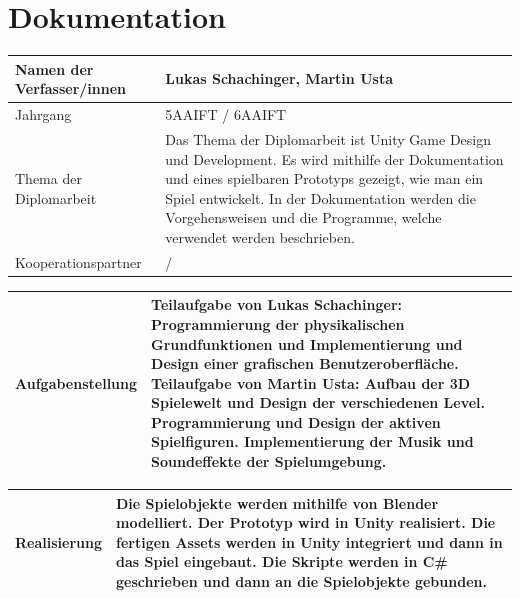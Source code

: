 \chapter{Dokumentation}

\renewcommand{\arraystretch}{2} %

\begin{tabular}{|m{}|m{}|}
\hline
Namen der Verfasser/innen & Lukas Schachinger, Martin Usta \\
\hline
Jahrgang & 5AAIFT / 6AAIFT \\
\hline
Thema der Diplomarbeit & Das Thema der Diplomarbeit ist Unity Game Design und Development. Es wird mithilfe der Dokumentation und eines spielbaren Prototyps gezeigt, wie man ein Spiel entwickelt. 
In der Dokumentation werden die Vorgehensweisen und die Programme, welche verwendet werden beschrieben. \\
\hline
Kooperationspartner & / \\
\hline
\end{tabular}

\vspace{10pt}

\noindent
\begin{tabular}{|m{}|m{}|}
\hline
Aufgabenstellung & Teilaufgabe von Lukas Schachinger: \newline \newline Programmierung der physikalischen Grundfunktionen und Implementierung und Design einer grafischen Benutzeroberfläche. \newline \newline Teilaufgabe von Martin Usta: \newline \newline Aufbau der 3D Spielewelt und Design der verschiedenen Level. Programmierung und Design der aktiven Spielfiguren. Implementierung der Musik und Soundeffekte der Spielumgebung.\\
\hline
\end{tabular}

\pagebreak

\noindent
\begin{tabular}{|m{}|m{}|}
\hline
Realisierung & Die Spielobjekte werden mithilfe von Blender modelliert. \newline \newline Der Prototyp wird in Unity realisiert. Die fertigen Assets werden in Unity integriert und dann in das Spiel eingebaut. \newline \newline Die Skripte werden in C\# geschrieben und dann an die Spielobjekte gebunden. \\
\hline
\end{tabular}

